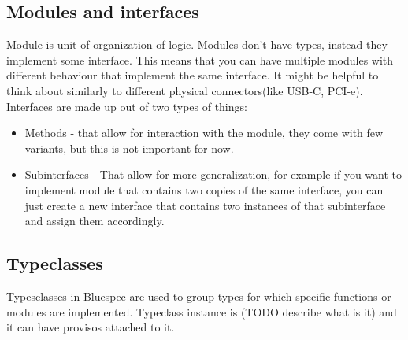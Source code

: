 \documentclass[12pt]{report}
\begin{document}
\subsection{Modules and interfaces}
Module is unit of organization of logic. Modules don't have types, instead they implement some interface. This means that you can have multiple modules with different behaviour that implement the same interface. It might be helpful to think about similarly to different physical connectors(like USB-C, PCI-e). Interfaces are made up out of two types of things:
\begin{itemize}
    \item Methods - that allow for interaction with the module, they come with few variants, but this is not important for now.
    \item Subinterfaces - That allow for more generalization, for example if you want to implement module that contains two copies of the same interface, you can just create a new interface that contains two instances of that subinterface and assign them accordingly.
\end{itemize}

\subsection{Typeclasses}
\label{sec:Typeclasses}
Typesclasses in Bluespec are used to group types for which specific functions or modules are implemented. Typeclass instance is (TODO describe what is it) and it can have provisos attached to it.
\end{document}

